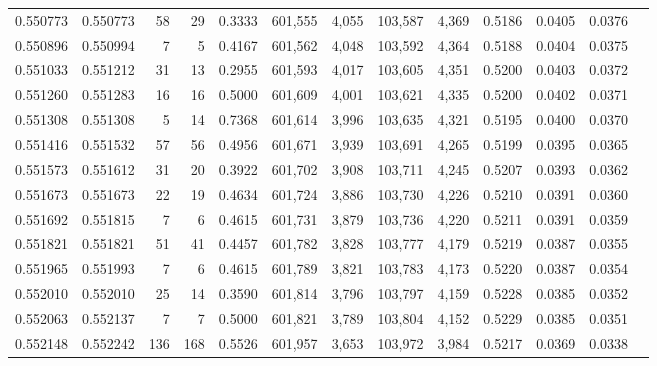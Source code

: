 \begin{tabular}{rrrrrrrrrrrrr}
0.550773 & 0.550773 &    58 &    29 &                                     0.3333 & 601,555 &   4,055 & 103,587 &   4,369 & 0.5186 & 0.0405 & 0.0376 \\
0.550896 & 0.550994 &     7 &     5 &                                     0.4167 & 601,562 &   4,048 & 103,592 &   4,364 & 0.5188 & 0.0404 & 0.0375 \\
0.551033 & 0.551212 &    31 &    13 &                                     0.2955 & 601,593 &   4,017 & 103,605 &   4,351 & 0.5200 & 0.0403 & 0.0372 \\
0.551260 & 0.551283 &    16 &    16 &                                     0.5000 & 601,609 &   4,001 & 103,621 &   4,335 & 0.5200 & 0.0402 & 0.0371 \\
0.551308 & 0.551308 &     5 &    14 &                                     0.7368 & 601,614 &   3,996 & 103,635 &   4,321 & 0.5195 & 0.0400 & 0.0370 \\
0.551416 & 0.551532 &    57 &    56 &                                     0.4956 & 601,671 &   3,939 & 103,691 &   4,265 & 0.5199 & 0.0395 & 0.0365 \\
0.551573 & 0.551612 &    31 &    20 &                                     0.3922 & 601,702 &   3,908 & 103,711 &   4,245 & 0.5207 & 0.0393 & 0.0362 \\
0.551673 & 0.551673 &    22 &    19 &                                     0.4634 & 601,724 &   3,886 & 103,730 &   4,226 & 0.5210 & 0.0391 & 0.0360 \\
0.551692 & 0.551815 &     7 &     6 &                                     0.4615 & 601,731 &   3,879 & 103,736 &   4,220 & 0.5211 & 0.0391 & 0.0359 \\
0.551821 & 0.551821 &    51 &    41 &                                     0.4457 & 601,782 &   3,828 & 103,777 &   4,179 & 0.5219 & 0.0387 & 0.0355 \\
0.551965 & 0.551993 &     7 &     6 &                                     0.4615 & 601,789 &   3,821 & 103,783 &   4,173 & 0.5220 & 0.0387 & 0.0354 \\
0.552010 & 0.552010 &    25 &    14 &                                     0.3590 & 601,814 &   3,796 & 103,797 &   4,159 & 0.5228 & 0.0385 & 0.0352 \\
0.552063 & 0.552137 &     7 &     7 &                                     0.5000 & 601,821 &   3,789 & 103,804 &   4,152 & 0.5229 & 0.0385 & 0.0351 \\
0.552148 & 0.552242 &   136 &   168 &                                     0.5526 & 601,957 &   3,653 & 103,972 &   3,984 & 0.5217 & 0.0369 & 0.0338 \\

\end{tabular}
